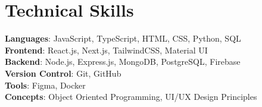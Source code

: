 \documentclass[letterpaper,11pt]{article}
\begin{document}
\section{Technical Skills}
 \begin{itemize}[leftmargin=0.15in, label={}]
    \small{\item{
     \textbf{Languages}{: JavaScript, TypeScript, HTML, CSS, Python, SQL} \\
     \textbf{Frontend}{: React.js, Next.js, TailwindCSS, Material UI } \\
     \textbf{Backend}{: Node.js, Express.js, MongoDB, PostgreSQL, Firebase} \\
     \textbf{Version Control}{: Git, GitHub} \\
     \textbf{Tools}{: Figma, Docker} \\
     \textbf{Concepts}{: Object Oriented Programming, UI/UX Design Principles } \\
    }}
 \end{itemize}

\end{document}
